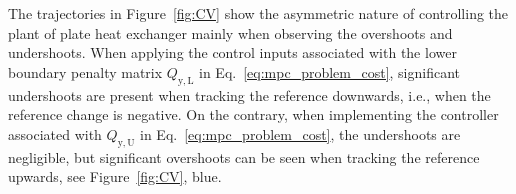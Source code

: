 \documentclass[preprint,12pt]{elsarticle}
\begin{document}


The trajectories in Figure~\ref{fig:CV} show the asymmetric nature of controlling the plant of plate heat exchanger mainly when observing the overshoots and undershoots. When applying the control inputs associated with the lower boundary penalty matrix $Q_\mathrm{y, L}$ in Eq.~\eqref{eq:mpc_problem_cost}, significant undershoots are present when tracking the reference downwards, i.e., when the reference change is negative. On the contrary, when implementing the controller associated with $Q_\mathrm{y, U}$ in Eq.~\eqref{eq:mpc_problem_cost}, the undershoots are negligible, but significant overshoots can be seen when tracking the reference upwards, see Figure~\ref{fig:CV}, blue.
\end{document}
